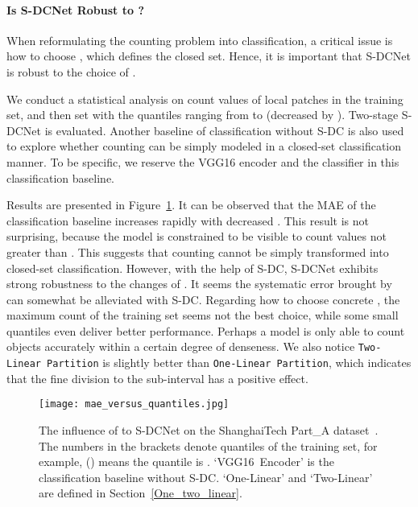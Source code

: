 \documentclass[10pt,twocolumn,letterpaper]{article}
\begin{document}
\paragraph{Is S-DCNet Robust to ?}


When reformulating the counting problem into classification, a critical issue is how to choose , which defines the closed set. Hence, it is important that S-DCNet is robust to the choice of .
	
	We conduct a statistical analysis on count values of local patches in the training set, and then set  with the quantiles ranging from  to  (decreased by ). Two-stage S-DCNet is evaluated. Another baseline of classification without S-DC is also used to explore whether counting can be simply modeled in a closed-set classification manner. To be specific, we reserve the VGG16 encoder and the classifier in this classification baseline.
	
	Results are presented in Figure~\ref{fig:mae_versus_cmax}. It can be observed that the MAE of the classification baseline increases rapidly with decreased . This result is not surprising, because the model is constrained to be visible to count values not greater than .  This suggests that counting cannot be simply transformed into closed-set classification. However, with the help of S-DC, S-DCNet exhibits strong robustness to the changes of . It seems the systematic error brought by  can somewhat be alleviated with S-DC. 
	Regarding how to choose concrete , the maximum count of the training set seems not the best choice, while some small quantiles even deliver better performance. Perhaps a model is only able to count objects accurately within a certain degree of denseness. We also notice \texttt{Two-Linear Partition} is slightly better than \texttt{One-Linear Partition}, which indicates that the fine division to the  sub-interval has a positive effect.


	\begin{figure}[t]
		\begin{center}
\texttt{[image: mae\_versus\_quantiles.jpg]}
		\end{center}
		\vspace{-10pt}
		\caption{The influence of  to S-DCNet on the ShanghaiTech Part\_A dataset~\cite{MCNN_2016_CVPR}. 
The numbers in the brackets denote quantiles of the training set, for example,  () means the  quantile is . `VGG16~Encoder' is the classification baseline without \mbox{S-DC}. 
`One-Linear' and `Two-Linear' are defined in Section~\ref{One_two_linear}.}
		\label{fig:mae_versus_cmax}
		\vspace{-10pt}
	\end{figure}
	
\end{document}
